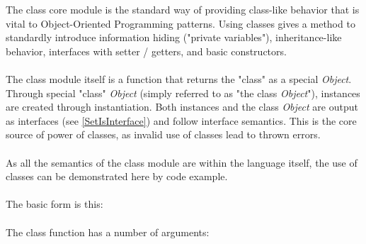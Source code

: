 \documentclass[12pt,letterpaper]{report}
\begin{document}
The class core module is the standard way of providing class-like behavior 
that is vital to Object-Oriented Programming patterns. Using classes gives a method 
to standardly introduce information hiding ("private variables"), inheritance-like behavior, 
interfaces with setter / getters, and basic constructors.
\\\\
The class module itself is a function that returns the "class" as a special \textit{Object}.
Through special "class" \textit{Object} (simply referred to as "the class \textit{Object}"), instances are created through instantiation.
Both instances and the class \textit{Object} are output as interfaces (see \autoref{SetIsInterface})
and follow interface semantics. This is the core source of power of classes, as invalid use 
of classes lead to thrown errors.
\\\\
As all the semantics of the class module are within the language itself,
the use of classes can be demonstrated here by code example.
\\\\
The basic form is this:
\\\\


The class function has a number of arguments:
\end{document}
